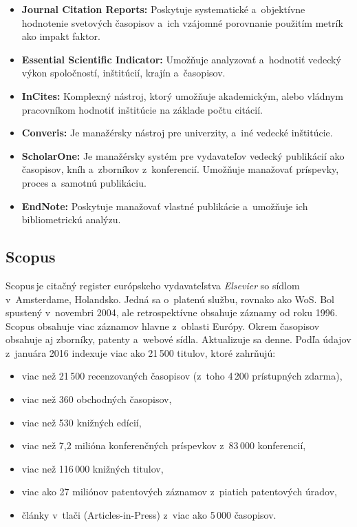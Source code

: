\begin{itemize}
\item \textbf{Journal Citation Reports:} Poskytuje systematické a~objektívne
  hodnotenie svetových časopisov a~ich vzájomné porovnanie použitím metrík ako
  impakt faktor.
\item \textbf{Essential Scientific Indicator:} Umožňuje analyzovať a~hodnotiť
  vedecký výkon spoločností, inštitúcií, krajín a~časopisov.
\item \textbf{InCites:} Komplexný nástroj, ktorý umožňuje akademickým, alebo
  vládnym pracovníkom hodnotiť inštitúcie na základe počtu citácií.
\item \textbf{Converis:} Je manažérsky nástroj pre univerzity, a~iné vedecké
  inštitúcie.
\item \textbf{ScholarOne:} Je manažérsky systém pre vydavateľov vedecký
  publikácií ako časopisov, kníh a~zborníkov z~konferencií.  Umožňuje manažovať
  príspevky,  proces a~samotnú publikáciu.
\item \textbf{EndNote:} Poskytuje manažovať vlastné publikácie a~umožňuje ich
  bibliometrickú analýzu.
\end{itemize}



\subsection{Scopus}
\label{sec:scopus}

Scopus\,\R je citačný register európskeho vydavateľstva \emph{Elsevier} so
sídlom v~Amsterdame, Holandsko.  Jedná sa o~platenú službu, rovnako ako WoS.
Bol spustený v~novembri 2004, ale retrospektívne obsahuje záznamy od roku 1996.
Scopus obsahuje viac záznamov hlavne z~oblasti Európy.  Okrem časopisov obsahuje
aj zborníky, patenty a~webové sídla.  Aktualizuje sa denne.  Podľa údajov
z~januára 2016 indexuje viac ako 21\,500 titulov, ktoré zahrňujú:

\begin{itemize}
\item viac než 21\,500 recenzovaných časopisov (z~toho 4\,200 prístupných
  zdarma),
\item viac než 360 obchodných časopisov,
\item viac než 530 knižných edícií,
\item viac než 7,2 milióna konferenčných príspevkov z~83\,000 konferencií,
\item viac než 116\,000 knižných titulov,
\item viac ako 27 miliónov patentových záznamov z~piatich patentových úradov,
\item články v~tlači (Articles-in-Press) z~viac ako 5\,000 časopisov.
\end{itemize}

